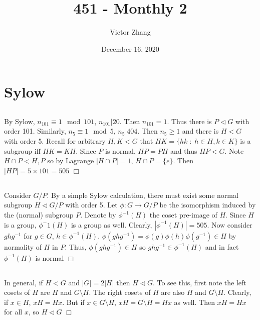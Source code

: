 \documentclass{article}
\title{451 - Monthly 2}
\author{Victor Zhang}
\date{December 16, 2020}
\begin{document}
\maketitle

\section{Sylow}
\subsection{}
By Sylow, $n_{101} \equiv 1 \mod 101$, $n_{101} \vert 20$. Then $n_{101} = 1$. Thus there is $P \lhd G$ with order 101. Similarly, $n_5 \equiv 1 \mod 5$, $n_5 \vert 404$. Then $n_5 \geqslant 1$ and there is $H < G$ with order 5. Recall for arbitrary $H,K < G$ that $HK = \{hk \;:\; h\in H, k \in K\}$ is a subgroup iff $HK = KH$. Since $P$ is normal, $HP = PH$ and thus $HP < G$. Note $H \cap P < H,P$ so by Lagrange $|H\cap P| = 1$, $H \cap P = \{e\}$. Then $|HP| = 5\times 101 = 505$ $\Box$
\subsection{}
Consider $G/P$. By a simple Sylow calculation, there must exist some normal subgroup $H \lhd G/P$ with order 5. Let $\phi : G \rightarrow G/P$ be the isomorphism induced by the (normal) subgroup $P$. Denote by $\phi^{-1}(H)$ the coset pre-image of $H$. Since $H$ is a group, $\phi^-1(H)$ is a group as well. Clearly, $|\phi^{-1}(H)| = 505$. Now consider $ghg^{-1}$ for $g \in G$, $h \in \phi^{-1}(H)$. $\phi(ghg^{-1}) = \phi(g) \phi(h) \phi(g^{-1}) \in H$ by normality of $H$ in $P$. Thus, $\phi(ghg^{-1}) \in H$ so $ghg^{-1} \in \phi^{-1}(H)$ and in fact $\phi^{-1}(H)$ is normal $\Box$
\subsection{}
In general, if $H<G$ and $|G| = 2|H|$ then $H \lhd G$. To see this, first note the left cosets of $H$ are $H$ and $G\setminus H$. The right cosets of $H$ are also $H$ and $G \setminus H$. Clearly, if $x \in H$, $xH = Hx$. But if $x \in G \setminus H$, $xH = G \setminus H = Hx$ as well. Then $xH = Hx$ for all $x$, so $H \lhd G$ $\Box$
\end{document}
